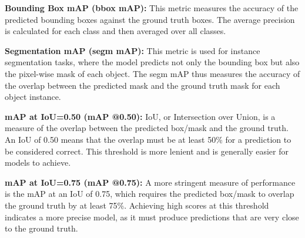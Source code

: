 \textbf{Bounding Box mAP (bbox mAP):} This metric measures the accuracy of the predicted bounding boxes against the ground truth boxes. The average precision is calculated for each class and then averaged over all classes. 

\textbf{Segmentation mAP (segm mAP): }This metric is used for instance segmentation tasks, where the model predicts not only the bounding box but also the pixel-wise mask of each object. The segm mAP thus measures the accuracy of the overlap between the predicted mask and the ground truth mask for each object instance.

\textbf{mAP at IoU=0.50 (mAP @0.50):} IoU, or Intersection over Union, is a measure of the overlap between the predicted box/mask and the ground truth. An IoU of 0.50 means that the overlap must be at least 50\% for a prediction to be considered correct. This threshold is more lenient and is generally easier for models to achieve.

\textbf{mAP at IoU=0.75 (mAP @0.75): }A more stringent measure of performance is the mAP at an IoU of 0.75, which requires the predicted box/mask to overlap the ground truth by at least 75\%. Achieving high scores at this threshold indicates a more precise model, as it must produce predictions that are very close to the ground truth.


